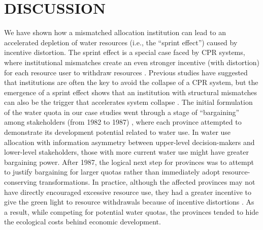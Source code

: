 \documentclass{nsr}
\begin{document}
\section{DISCUSSION}\label{discussion}
We have shown how a mismatched allocation institution can lead to an accelerated depletion of water resources (i.e., the “sprint effect”) caused by incentive distortion. The sprint effect is a special case faced by CPR systems, where institutional mismatches create an even stronger incentive (with distortion) for each resource user to withdraw resources
\cite{ostromRevisitingCommonsLocal1999,ostromGeneralFrameworkAnalyzing2009,castilla-rhoSocialtippingpoints2017}.
Previous studies have suggested that institutions are often the key to avoid the collapse of a CPR system, but the emergence of a sprint effect shows that an institution with structural mismatches can also be the trigger that accelerates system collapse \cite{bodinConservationSuccessFunction2014,bodinCollaborativeenvironmentalgovernance2017,wangAlignmentsocialecological2019}.
The initial formulation of the water quota in our case studies went through a stage of “bargaining” among stakeholders (from 1982 to 1987) \cite{wangReviewImplementationYellow2019, wangThingsCurrentSignificance2019}, where each province attempted to demonstrate its development potential related to water use.
In water use allocation with information asymmetry between upper-level decision-makers and lower-level stakeholders, those with more current water use might have greater bargaining power. After 1987, the logical next step for provinces was to attempt to justify bargaining for larger quotas rather than immediately adopt resource-conserving transformations. In practice, although the affected provinces may not have directly encouraged excessive resource use, they had a greater incentive to give the green light to resource withdrawals because of incentive distortions \cite{kriegerProgressGroundWater1955, ostromGoverningCommonsEvolution1990}. As a result, while competing for potential water quotas, the provinces tended to hide the ecological costs behind economic development.
\end{document}

